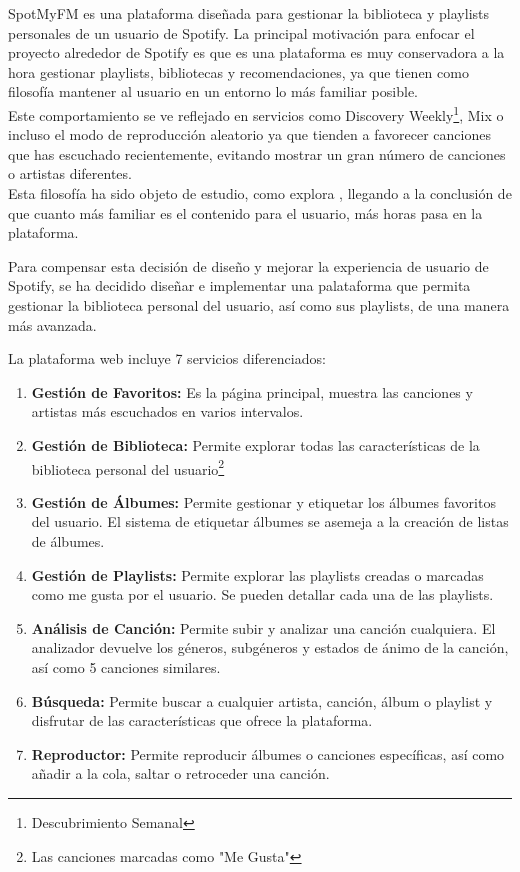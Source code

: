 
SpotMyFM es una plataforma diseñada para gestionar la biblioteca y playlists personales de un usuario de Spotify. La principal motivación para enfocar el proyecto alrededor de Spotify es que es una plataforma es muy conservadora a la hora gestionar playlists, bibliotecas y recomendaciones, ya que tienen como filosofía mantener al usuario en un entorno lo más familiar posible.\\
Este comportamiento se ve reflejado en servicios como Discovery Weekly\footnote{Descubrimiento Semanal}, Mix o incluso el modo de reproducción aleatorio ya que tienden a favorecer canciones que has escuchado recientemente, evitando mostrar un gran número de canciones o artistas diferentes. \\
Esta filosofía ha sido objeto de estudio, como explora \cite{spotify_recommendations}, llegando a la conclusión de que cuanto más familiar es el contenido para el usuario, más horas pasa en la plataforma.

Para compensar esta decisión de diseño y mejorar la experiencia de usuario de Spotify, se ha decidido diseñar e implementar una palataforma que permita gestionar la biblioteca personal del usuario, así como sus playlists, de una manera más avanzada. 

La plataforma web incluye 7 servicios diferenciados:
\begin{enumerate}
    \item \textbf{Gestión de Favoritos:} Es la página principal, muestra las canciones y artistas más escuchados en varios intervalos.
    \item \textbf{Gestión de Biblioteca:} Permite explorar todas las características de la biblioteca personal del usuario\footnote{Las canciones marcadas como "Me Gusta"}
    \item \textbf{Gestión de Álbumes:} Permite gestionar y etiquetar los álbumes favoritos del usuario. El sistema de etiquetar álbumes se asemeja a la creación de listas de álbumes. 
    \item \textbf{Gestión de Playlists:} Permite explorar las playlists creadas o marcadas como me gusta por el usuario. Se pueden detallar cada una de las playlists.
    \item \textbf{Análisis de Canción:} Permite subir y analizar una canción cualquiera. El analizador devuelve los géneros, subgéneros y estados de ánimo de la canción, así como 5 canciones similares. 
    \item \textbf{Búsqueda:} Permite buscar a cualquier artista, canción, álbum o playlist y disfrutar de las características que ofrece la plataforma. 
    \item \textbf{Reproductor:} Permite reproducir álbumes o canciones específicas, así como añadir a la cola, saltar o retroceder una canción.
\end{enumerate}

